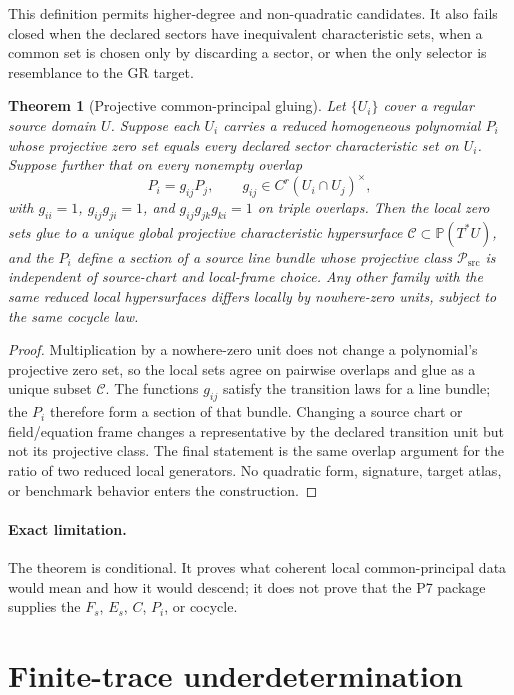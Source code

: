 \documentclass[11pt]{article}
\theoremstyle{definition}
\theoremstyle{plain}
\newtheorem{theorem}{Theorem}
\newcommand{\Psrc}{\mathcal{P}_{\mathrm{src}}}
\newcommand{\Proj}{\mathbb{P}}
\newcommand{\Char}{\mathcal{C}}
\begin{document}
This definition permits higher-degree and non-quadratic candidates. It also
fails closed when the declared sectors have inequivalent characteristic sets,
when a common set is chosen only by discarding a sector, or when the only
selector is resemblance to the GR target.

\begin{theorem}[Projective common-principal gluing]
Let $\{U_i\}$ cover a regular source domain $U$. Suppose each $U_i$ carries a
reduced homogeneous polynomial $P_i$ whose projective zero set equals every
declared sector characteristic set on $U_i$. Suppose further that on every
nonempty overlap
\[
  P_i=g_{ij}P_j,
  \qquad g_{ij}\in C^{r}(U_i\cap U_j)^{\times},
\]
with $g_{ii}=1$, $g_{ij}g_{ji}=1$, and
$g_{ij}g_{jk}g_{ki}=1$ on triple overlaps. Then the local zero sets glue to a
unique global projective characteristic hypersurface $\Char\subset
\Proj(T^*U)$, and the $P_i$ define a section of a source line bundle whose
projective class $\Psrc$ is independent of source-chart and local-frame
choice. Any other family with the same reduced local hypersurfaces differs
locally by nowhere-zero units, subject to the same cocycle law.
\end{theorem}

\begin{proof}
Multiplication by a nowhere-zero unit does not change a polynomial's
projective zero set, so the local sets agree on pairwise overlaps and glue as
a unique subset $\Char$. The functions $g_{ij}$ satisfy the transition laws
for a line bundle; the $P_i$ therefore form a section of that bundle. Changing
a source chart or field/equation frame changes a representative by the
declared transition unit but not its projective class. The final statement is
the same overlap argument for the ratio of two reduced local generators.
No quadratic form, signature, target atlas, or benchmark behavior enters the
construction.
\end{proof}

\paragraph{Exact limitation.}
The theorem is conditional. It proves what coherent local common-principal
data would mean and how it would descend; it does not prove that the P7 package
supplies the $F_s$, $E_s$, $C$, $P_i$, or cocycle.

\section{Finite-trace underdetermination}
\end{document}
